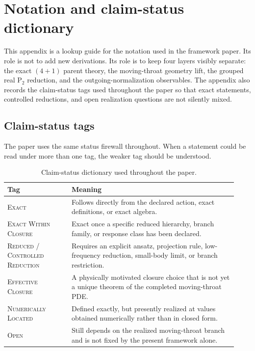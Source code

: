 \documentclass[11pt]{article}
\theoremstyle{definition}
\newcommand{\Ptwo}{\ensuremath{\mathrm{P}_2}}
\begin{document}
\appendix

\section{Notation and claim-status dictionary}
\label{app:notation-status}

This appendix is a lookup guide for the notation used in the framework paper. Its role is not to add new derivations. Its role is to keep four layers visibly separate: the exact $(4+1)$ parent theory, the moving-throat geometry lift, the grouped real $\Ptwo$ reduction, and the outgoing-normalization observables. The appendix also records the claim-status tags used throughout the paper so that exact statements, controlled reductions, and open realization questions are not silently mixed.

\subsection{Claim-status tags}

The paper uses the same status firewall throughout. When a statement could be read under more than one tag, the weaker tag should be understood.

\begin{table}[ht]
\centering
\renewcommand{\arraystretch}{1.15}
\begin{tabular}{@{}L{0.26\linewidth}L{0.67\linewidth}@{}}
\toprule
Tag & Meaning \\
\midrule
\textsc{Exact} & Follows directly from the declared action, exact definitions, or exact algebra. \\
\textsc{Exact Within Closure} & Exact once a specific reduced hierarchy, branch family, or response class has been declared. \\
\textsc{Reduced / Controlled Reduction} & Requires an explicit ansatz, projection rule, low-frequency reduction, small-body limit, or branch restriction. \\
\textsc{Effective Closure} & A physically motivated closure choice that is not yet a unique theorem of the completed moving-throat PDE. \\
\textsc{Numerically Located} & Defined exactly, but presently realized at values obtained numerically rather than in closed form. \\
\textsc{Open} & Still depends on the realized moving-throat branch and is not fixed by the present framework alone. \\
\bottomrule
\end{tabular}
\caption{Claim-status dictionary used throughout the paper.}
\label{tab:appendix-claim-status}
\end{table}
\end{document}
